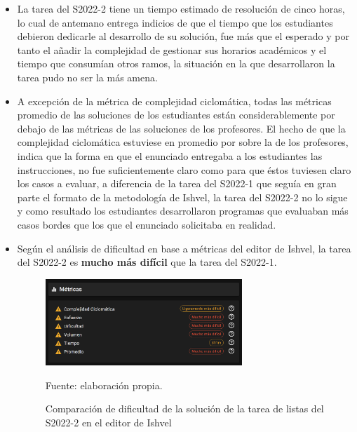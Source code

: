 \documentclass[letterpaper,12pt]{article}
\begin{document}
\begin{itemize}
  \item La tarea del S2022-2 tiene un tiempo estimado de resolución de cinco horas, lo cual de antemano entrega indicios de que el tiempo que los estudiantes debieron dedicarle al desarrollo de su solución, fue más que el esperado y por tanto el añadir la complejidad de gestionar sus horarios académicos y el tiempo que consumían otros ramos, la situación en la que desarrollaron la tarea pudo no ser la más amena.
  \item A excepción de la métrica de complejidad ciclomática, todas las métricas promedio de las soluciones de los estudiantes están considerablemente por debajo de las métricas de las soluciones de los profesores. El hecho de que la complejidad ciclomática estuviese en promedio por sobre la de los profesores, indica que la forma en que el enunciado entregaba a los estudiantes las instrucciones, no fue suficientemente claro como para que éstos tuviesen claro los casos a evaluar, a diferencia de la tarea del S2022-1 que seguía en gran parte el formato de la metodología de Ishvel, la tarea del S2022-2 no lo sigue y como resultado los estudiantes desarrollaron programas que evaluaban más casos bordes que los que el enunciado solicitaba en realidad.
  \item Según el análisis de dificultad en base a métricas del editor de Ishvel, la tarea del S2022-2 es \textbf{mucho más difícil} que la tarea del S2022-1.
        \begin{figure}[H]
          \centering
          \includegraphics[width=0.7\textwidth]{figures/metricstList2.png}
          \caption{Comparación de dificultad de la solución de la tarea de listas del S2022-2 en el editor de Ishvel} Fuente: elaboración propia.
          \label{img:metricsList2}
        \end{figure}
\end{itemize}
\end{document}
